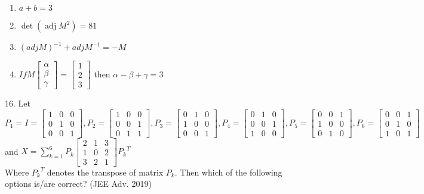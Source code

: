 \documentclass[journal,12pt,twocolumn]{IEEEtran}
\theoremstyle{remark}
\begin{document}
\begin{enumerate}
    \item $a+b=3$
    \item $\mathop{det}(\mathop{adj}M^2)=81$
    \item $(adjM)^{-1}+adjM^{-1}=-M$
    \item $If M\begin{bmatrix}
        \alpha\\
        \beta\\
        \gamma
    \end{bmatrix} = \begin{bmatrix}
        1\\
        2\\
        3
    \end{bmatrix}$ then $\alpha-\beta+\gamma=3$\\[2pt]
\end{enumerate}

16. Let\\
$
P_1=I=\begin{bmatrix}
    1 & 0 & 0\\
    0 & 1 & 0\\
    0 & 0 & 1
\end{bmatrix}, P_2 = \begin{bmatrix}
    1 & 0 & 0\\
    0 & 0 & 1\\
    0 & 1 & 1
\end{bmatrix}, P_3 = \begin{bmatrix}
    0 & 1 & 0\\
    1 & 0 & 0\\
    0 & 0 & 1
\end{bmatrix}, P_4 = \begin{bmatrix}
    0 & 1 & 0\\
    0 & 0 & 1\\
    1 & 0 & 0
\end{bmatrix}, P_5 = \begin{bmatrix}
    0 & 0 & 1\\
    1 & 0 & 0\\
    0 & 1 & 0
\end{bmatrix}, P_6 = \begin{bmatrix}
    0 & 0 & 1\\
    0 & 1 & 0\\
    1 & 0 & 1
\end{bmatrix}
$ and $\displaystyle X = \sum_{k=1}^{6}P_k\begin{bmatrix}
    2 & 1 & 3\\
    1 & 0 & 2\\
    3 & 2 & 1
\end{bmatrix}{P_k}^T$\\Where ${P_k}^T$ denotes the transpose of matrix $P_k$. Then which of the following options is/are correct? \hfill (JEE Adv. 2019)
\end{document}
